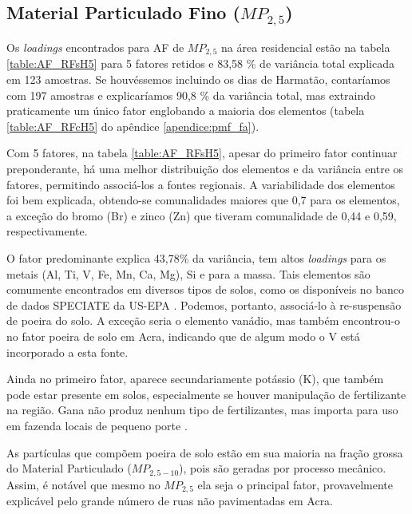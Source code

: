 \subsection{Material Particulado Fino ($MP_{2,5}$) \label{sec:pm2.5}}

Os \textit{loadings} encontrados para AF de $MP_{2,5}$ na área residencial 
estão na tabela \ref{table:AF_RFsH5} para 5 fatores retidos
e 83,58 \% de variância total explicada em 123 amostras. 
Se houvéssemos incluindo os dias de Harmatão, contaríamos com 197 amostras e 
explicaríamos 90,8 \% da variância total, mas extraindo praticamente um único fator 
englobando a maioria dos elementos (tabela \ref{table:AF_RFcH5} do apêndice \ref{apendice:pmf_fa}).

Com 5 fatores, na tabela \ref{table:AF_RFsH5}, apesar do primeiro fator 
continuar preponderante, há uma melhor distribuição dos elementos e da 
variância entre os fatores, permitindo associá-los a fontes regionais.
A variabilidade dos elementos foi bem explicada, obtendo-se comunalidades 
maiores que 0,7 para os elementos, a exceção do bromo (Br) e zinco (Zn) que 
tiveram comunalidade de 0,44 e 0,59, respectivamente.

O fator predominante explica 43,78\% da variância, tem altos \textit{loadings} 
para os metais (Al, Ti, V, Fe, Mn, Ca, Mg), Si e para a massa. Tais elementos 
são comumente encontrados em diversos tipos de solos, como os disponíveis no 
banco de dados SPECIATE da US-EPA \citep{simon2010}. Podemos, portanto, 
associá-lo à re-suspensão de poeira do solo. A exceção seria o elemento vanádio,
mas \citet{aboh2009} também encontrou-o no fator poeira de solo em Acra, 
indicando que de algum modo o V está incorporado a esta fonte.

Ainda no primeiro fator, aparece secundariamente potássio (K), 
que também pode estar presente em solos, especialmente se houver manipulação 
de fertilizante na região. Gana não produz nenhum tipo de fertilizantes,
mas importa para uso em fazenda locais de pequeno porte \citep{fianko2011}. 

As partículas que compõem poeira de solo estão em sua maioria na fração
grossa do Material Particulado ($MP_{2,5-10}$), pois são geradas por processo 
mecânico. Assim, é notável que mesmo no $MP_{2,5}$ ela seja o principal fator, 
provavelmente explicável pelo grande número de ruas não pavimentadas em Acra. 


